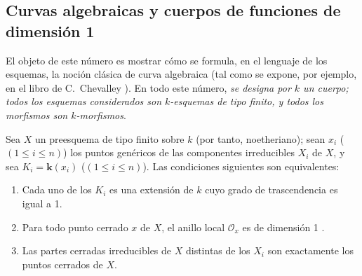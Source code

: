 \documentclass[oneside,10pt]{amsart}
\renewcommand{\leq}{\leqslant}
\newcommand{\oldpage}[2][]{\marginnote{\normalfont\footnotesize\textbf{#1}~|~#2}\ignorespaces}
\let\EGAOriginalLabel\label
\renewcommand{\label}[1]{\phantomsection\EGAOriginalLabel{#1}}
\begin{document}
\oldpage[II]{148}

\subsection{Curvas algebraicas y cuerpos de funciones de dimensión 1}
\label{subsection:II.7.4-fr}

El objeto de este número es mostrar cómo se formula, en el lenguaje de los esquemas, la noción clásica de curva algebraica (tal como se expone, por ejemplo, en el libro de C.~Chevalley \cite{II-23}).
En todo este número, \emph{se designa por $k$ un cuerpo; todos los esquemas considerados son $k$-esquemas de tipo finito, y todos los morfismos son $k$-morfismos}.

\begin{proposition}[7.4.1]
\label{II.7.4.1-fr}
Sea $X$ un preesquema de tipo finito sobre $k$ (por tanto, noetheriano);
sean $x_i$ ($(1\leq i\leq n)$) los puntos genéricos de las componentes irreducibles $X_i$ de $X$, y sea $K_i=\boldsymbol{k}(x_i)$ ($(1\leq i\leq n)$).
Las condiciones siguientes son equivalentes:
\begin{enumerate}
    \item[\rm{(a)}] Cada uno de los $K_i$ es una extensión de $k$ cuyo grado de trascendencia es igual a 1.
    \item[\rm{(b)}] Para todo punto cerrado $x$ de $X$, el anillo local $\mathcal{O}_x$ es de dimensión 1 .
    \item[\rm{(c)}] Las partes cerradas irreducibles de $X$ distintas de los $X_i$ son exactamente los puntos cerrados de $X$.
\end{enumerate}
\end{proposition}
\end{document}
